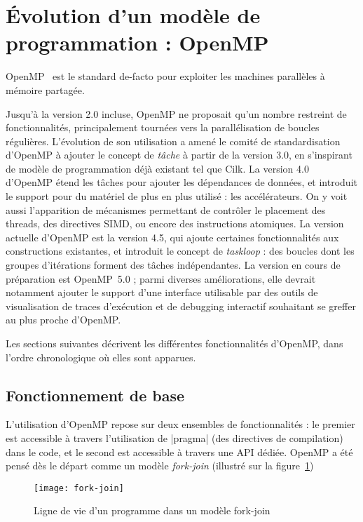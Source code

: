\section{Évolution d'un modèle de programmation : OpenMP}\label{sec:context:openmp}

OpenMP~\cite{openmp45} est le standard de-facto pour exploiter les machines parallèles à mémoire partagée.

Jusqu'à la version 2.0 incluse, OpenMP ne proposait qu'un nombre restreint de fonctionnalités, principalement tournées vers la parallélisation de boucles régulières.
L'évolution de son utilisation a amené le comité de standardisation d'OpenMP à ajouter le concept de \emph{tâche} à partir de la version 3.0, en s'inspirant de modèle de programmation déjà existant tel que Cilk.
La version 4.0 d'OpenMP étend les tâches pour ajouter les dépendances de données, et introduit le support pour du matériel de plus en plus utilisé : les accélérateurs.
On y voit aussi l'apparition de mécanismes permettant de contrôler le placement des threads, des directives SIMD, ou encore des instructions atomiques.
La version actuelle d'OpenMP est la version 4.5, qui ajoute certaines fonctionnalités aux constructions existantes, et introduit le concept de \emph{taskloop} : des boucles dont les groupes d'itérations forment des tâches indépendantes.
La version en cours de préparation est OpenMP~5.0 ; parmi diverses améliorations, elle devrait notamment ajouter le support d'une interface utilisable par des outils de visualisation de traces d'exécution et de debugging interactif souhaitant se greffer au plus proche d'OpenMP.

Les sections suivantes décrivent les différentes fonctionnalités d'OpenMP, dans l'ordre chronologique où elles sont apparues.

\subsection{Fonctionnement de base}



L'utilisation d'OpenMP repose sur deux ensembles de fonctionnalités : le premier est accessible à travers l'utilisation de |pragma| (des directives de compilation) dans le code, et le second est accessible à travers une API dédiée.
OpenMP a été pensé dès le départ comme un modèle \emph{fork-join} (illustré sur la figure~\ref{fig:context:fork-join})

\begin{figure}[ht]
  \centering
  \texttt{[image: fork-join]}
  \caption{Ligne de vie d'un programme dans un modèle fork-join}\label{fig:context:fork-join}
\end{figure}

